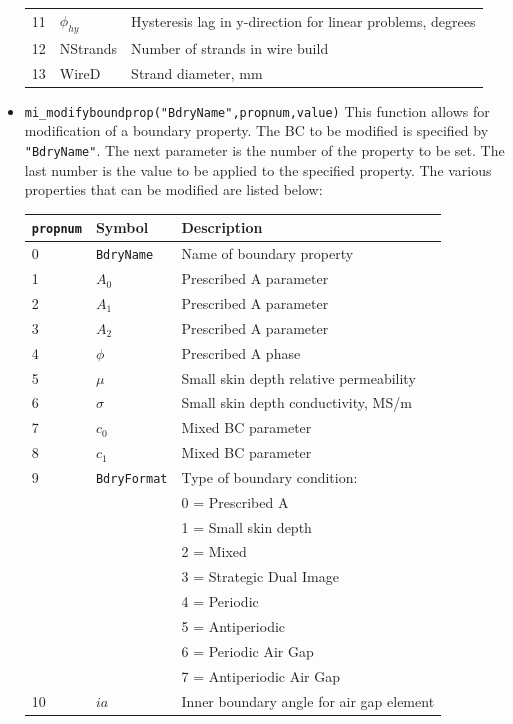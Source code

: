 \begin{itemize}
\begin{center}
\begin{tabular}{lll}
 11 & $\phi_{hy}$ & Hysteresis lag in y-direction for linear problems, degrees \\
 12 & NStrands & Number of strands in wire build \\
 13 & WireD & Strand diameter, mm \\
 \hline
 \end{tabular}
 \end{center}
\item{\verb+mi_modifyboundprop("BdryName",propnum,value)+}
This function allows for modification of a boundary property. The
BC to be modified is specified by {\tt "BdryName"}.  The next
parameter is the number of the property to be set. The last number
is the value to be applied to the specified property.  The various
properties that can be modified are listed below:
\begin{center}
\begin{tabular}{lll} \hline
{\tt propnum}& Symbol & Description \\ \hline
 0 & {\tt BdryName} & Name of boundary property \\
 1 & $A_0$ & Prescribed A parameter \\
 2 & $A_1$ & Prescribed A parameter \\
 3 & $A_2$ & Prescribed A parameter \\
 4 & $\phi$ & Prescribed A phase \\
 5 & $\mu$ & Small skin depth relative permeability \\
 6 & $\sigma$ & Small skin depth conductivity, MS/m \\
 7 & $c_0$ & Mixed BC parameter \\
 8 & $c_1$ & Mixed BC parameter \\
 9 & {\tt BdryFormat} & Type of boundary condition: \\
   &                 & 0 = Prescribed A \\
   &                 & 1 = Small skin depth \\
   &                 & 2 = Mixed \\
   &                 & 3 = Strategic Dual Image \\
   &                 & 4 = Periodic \\
   &                 & 5 = Antiperiodic \\ 
   &                 & 6 = Periodic Air Gap \\ 
   &                 & 7 = Antiperiodic Air Gap \\ 
10 & $ia$ &  Inner boundary angle for air gap element \\

\end{tabular}
\end{center}
\end{itemize}
